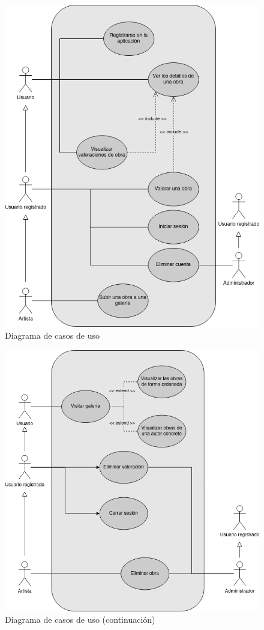 \begin{figure}[H]
    \centering
    \includegraphics[width=\textwidth]{diagramas/casos_de_uso.png}
    \caption{Diagrama de casos de uso}
    \label{fig:casos_de_uso}
\end{figure}

\begin{figure}[H]
    \centering
    \includegraphics[width=\textwidth]{diagramas/casos_de_uso_2.png}
    \caption{Diagrama de casos de uso (continuación)}
    \label{fig:casos_de_uso_continuacion}
\end{figure}

